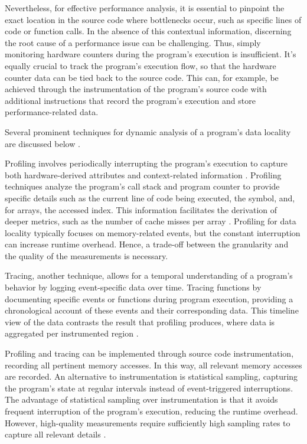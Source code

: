 Nevertheless, for effective performance analysis, it is essential to pinpoint the exact location in the source code where bottlenecks occur, such as specific lines of code or function calls. In the absence of this contextual information, discerning the root cause of a performance issue can be challenging. Thus, simply monitoring hardware counters during the program's execution is insufficient. It's equally crucial to track the program's execution flow, so that the hardware counter data can be tied back to the source code. This can, for example, be achieved through the instrumentation of the program's source code with additional instructions that record the program's execution and store performance-related data.

Several prominent techniques for dynamic analysis of a program's data locality are discussed below \cite{shende1999profiling,itzkowitz2003memory,gimenez2017memaxes,mckinley1999quantifying,adhianto2010hpctoolkit}.

Profiling involves periodically interrupting the program's execution to capture both hardware-derived attributes and context-related information \cite{itzkowitz2003memory,gimenez2017memaxes,adhianto2010hpctoolkit}. Profiling techniques analyze the program's call stack and program counter to provide specific details such as the current line of code being executed, the symbol, and, for arrays, the accessed index. This information facilitates the derivation of deeper metrics, such as the number of cache misses per array \cite{adhianto2010hpctoolkit}. Profiling for data locality typically focuses on memory-related events, but the constant interruption can increase runtime overhead. Hence, a trade-off between the granularity and the quality of the measurements is necessary.

Tracing, another technique, allows for a temporal understanding of a program's behavior by logging event-specific data over time. Tracing functions by documenting specific events or functions during program execution, providing a chronological account of these events and their corresponding data. This timeline view of the data contrasts the result that profiling produces, where data is aggregated per instrumented region \cite{shende1999profiling,adhianto2010hpctoolkit,mckinley1999quantifying}.

Profiling and tracing can be implemented through source code instrumentation, recording all pertinent memory accesses. In this way, all relevant memory accesses are recorded. An alternative to instrumentation is statistical sampling, capturing the program's state at regular intervals instead of event-triggered interruptions. The advantage of statistical sampling over instrumentation is that it avoids frequent interruption of the program's execution, reducing the runtime overhead. However, high-quality measurements require sufficiently high sampling rates to capture all relevant details \cite{adhianto2010hpctoolkit}.


